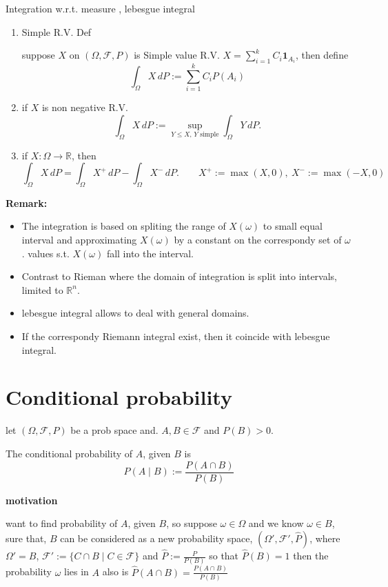 \documentclass[
  letterpaper,
  DIV=11,
  numbers=noendperiod]{scrreprt}
\providecommand{\tightlist}{%
  \setlength{\itemsep}{0pt}\setlength{\parskip}{0pt}}
\theoremstyle{definition}
\theoremstyle{plain}
\theoremstyle{plain}
\theoremstyle{definition}
\theoremstyle{plain}
\theoremstyle{plain}
\theoremstyle{remark}
\begin{document}
Integration w.r.t. measure , lebesgue integral

\begin{enumerate}
\def\labelenumi{\arabic{enumi}.}
\item
  Simple R.V. Def

  suppose \(X\) on \((\Omega, \mathcal{F}, P)\) is Simple value R.V.
  \(X = \sum_{i=1}^{k} C_i \mathbf{1}_{A_i}\), then define \[
  \int_\Omega X \, dP := \sum_{i=1}^{k} C_i P(A_i)
  \]
\item
  if \(X\) is non negative R.V. \[
  \int_\Omega X \, dP := \sup_{Y \leq X, \, Y \text{ simple}} \int_\Omega Y \, dP.
  \]
\item
  if \(X : \Omega \to \mathbb{R}\), then \[
  \int_\Omega X \, dP = \int_\Omega X^+ \, dP - \int_\Omega X^- \, dP. \qquad X^+ := \max(X, 0), \ X^- := \max(-X, 0)
  \]
\end{enumerate}

\textbf{Remark:}

\begin{itemize}
\tightlist
\item
  The integration is based on spliting the range of \(X(\omega)\) to
  small equal interval and approximating \(X(\omega)\) by a constant on
  the correspondy set of \(\omega\). values s.t. \(X(\omega)\) fall into
  the interval.
\item
  Contrast to Rieman where the domain of integration is split into
  intervals, limited to \(\mathbb{R}^n\).
\item
  lebesgue integral allows to deal with general domains.
\item
  If the correspondy Riemann integral exist, then it coincide with
  lebesgue integral.
\end{itemize}

\section{Conditional probability}\label{conditional-probability}

let \((\Omega, \mathcal{F}, P)\) be a prob space and.
\(A, B \in \mathcal{F}\) and \(P(B) > 0\).

The conditional probability of \(A\), given \(B\) is \[
P(A \mid B) := \frac{P(A \cap B)}{P(B)}
\]

\textbf{motivation}

want to find probability of \(A\), given \(B\), so suppose
\(\omega \in \Omega\) and we know \(\omega \in B\), sure that, \(B\) can
be considered as a new probability space,
\((\Omega', \mathcal{F}', \hat{P})\), where \(\Omega' = B\),
\(\mathcal{F}' := \{C \cap B \mid C \in \mathcal{F}\}\) and
\(\hat{P} := \frac{P}{P(B)}\) so that \(\hat{P}(B) = 1\) then the
probability \(\omega\) lies in \(A\) also is
\(\hat{P}(A \cap B) = \frac{P(A \cap B)}{P(B)}\)
\end{document}
